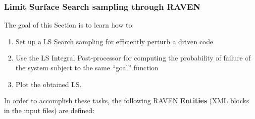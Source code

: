 \subsubsection{Limit Surface Search sampling through RAVEN}
\label{subsub:LSsamplingExample}
The goal of this Section is to learn how to:
 \begin{enumerate}
   \item Set up a LS Search sampling for efficiently perturb a driven code
   \item Use the LS Integral Post-processor for computing the probability of failure of the system subject to the same
   ``goal'' function
   \item Plot the obtained LS.
\end{enumerate}
In order to accomplish these tasks, the following RAVEN \textbf{Entities} (XML blocks in the input files) are defined:
